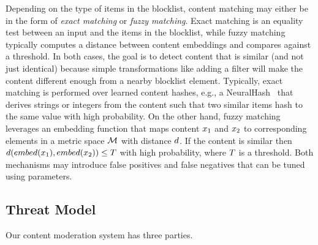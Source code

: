 %
Depending on the type of items in the blocklist, content matching may either be in the form of \emph{exact matching} or \emph{fuzzy matching}. Exact matching is an 
equality test between an input and the items in the blocklist, while fuzzy matching typically computes a 
distance between content embeddings and compares against a threshold. In both cases, the goal is to 
detect content that is similar (and not just identical) because simple transformations like adding a filter 
will make the content different enough from a nearby blocklist element. Typically, exact matching is performed over learned content hashes, e.g., a NeuralHash~\cite{apple2021csam} that derives strings or integers from the content such that two similar items hash to the same value with high probability. On the 
other hand, fuzzy matching leverages an embedding function  that maps content $\genericSetElmt[1]$ and 
$\genericSetElmt[2]$ to corresponding elements in a metric space 
$\metricSpace$ with distance $\distance$. If the content is similar then 
$\distanceNotation[\distance][\contentHash(\genericSetElmt[1])][\contentHash(\genericSetElmt[2])] 
\le \threshold$ with high 
probability, where $T$ is a threshold. Both mechanisms may introduce false positives and false negatives that can be tuned using parameters. 
 

\subsection{Threat Model}
%
Our content moderation system has three parties.


